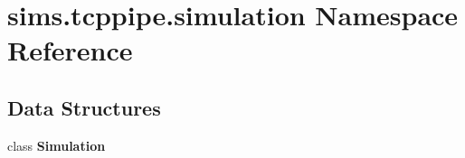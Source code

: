 \section{sims.\+tcppipe.\+simulation Namespace Reference}
\label{namespacesims_1_1tcppipe_1_1simulation}
\subsection*{Data Structures}
\begin{DoxyCompactItemize}
\item 
class {\bf Simulation}
\end{DoxyCompactItemize}
